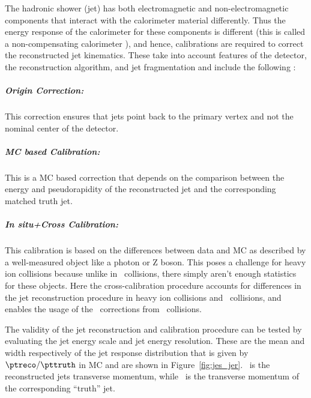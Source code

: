 
The hadronic shower (jet) has both electromagnetic and non-electromagnetic components that interact with the calorimeter material differently.
Thus the energy response of the calorimeter for these components is different (this is called a non-compensating calorimeter \cite{calorimetry_book}), and hence, calibrations are required to correct the reconstructed jet kinematics.
These take into account features of the detector, the reconstruction algorithm, and jet fragmentation and include the following \cite{Aad:2014bia}:
\subparagraph{Origin Correction: } This correction ensures that jets point back to the primary vertex and not the nominal center of the detector.
\subparagraph{MC based Calibration: } This is a MC based correction that depends on the comparison between the energy and pseudorapidity of the reconstructed jet and the corresponding matched truth jet.
\subparagraph{\textit{In situ}+Cross Calibration: } This calibration is based on the differences between data and MC as described by a well-measured object like a photon or Z boson.
This poses a challenge for heavy ion collisions because unlike in \pp\ collisions, there simply aren't enough statistics for these objects.
Here the cross-calibration procedure accounts for differences in the jet reconstruction procedure in heavy ion collisions and \pp\ collisions, and enables the usage of the \insitu\ corrections from \pp\ collisions.

The validity of the jet reconstruction and calibration procedure can be tested by evaluating the jet energy scale and jet energy resolution.
These are the mean and width respectively of the jet response distribution that is given by $\ptreco / \pttruth$ in MC and are shown in Figure~\ref{fig:jes_jer}.
\ptreco\ is the reconstructed jets transverse momentum, while \pttruth\ is the transverse momentum of the corresponding ``truth'' jet.


